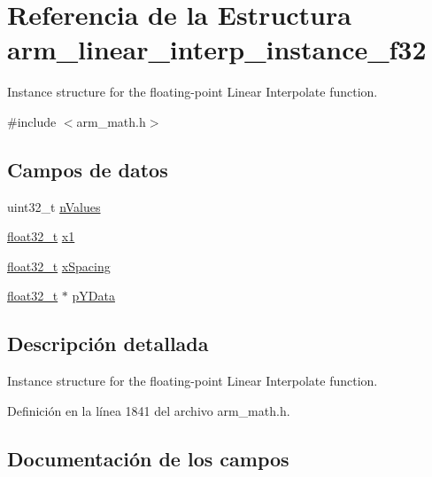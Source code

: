 \hypertarget{structarm__linear__interp__instance__f32}{}\section{Referencia de la Estructura arm\+\_\+linear\+\_\+interp\+\_\+instance\+\_\+f32}
\label{structarm__linear__interp__instance__f32}


Instance structure for the floating-\/point Linear Interpolate function.  




{\ttfamily \#include $<$arm\+\_\+math.\+h$>$}

\subsection*{Campos de datos}
\begin{DoxyCompactItemize}
\item 
uint32\+\_\+t \hyperlink{structarm__linear__interp__instance__f32_a2ea653b0599388e9a72ebab9841707ba}{n\+Values}
\item 
\hyperlink{arm__math_8h_a4611b605e45ab401f02cab15c5e38715}{float32\+\_\+t} \hyperlink{structarm__linear__interp__instance__f32_a795ed79ea4c18d52afe5eb5e868e1c5a}{x1}
\item 
\hyperlink{arm__math_8h_a4611b605e45ab401f02cab15c5e38715}{float32\+\_\+t} \hyperlink{structarm__linear__interp__instance__f32_a08675584bb57fc42bbb3739c13674346}{x\+Spacing}
\item 
\hyperlink{arm__math_8h_a4611b605e45ab401f02cab15c5e38715}{float32\+\_\+t} $\ast$ \hyperlink{structarm__linear__interp__instance__f32_af1489866b69eb5db1e0afeb24c7b01e9}{p\+Y\+Data}
\end{DoxyCompactItemize}


\subsection{Descripción detallada}
Instance structure for the floating-\/point Linear Interpolate function. 

Definición en la línea 1841 del archivo arm\+\_\+math.\+h.



\subsection{Documentación de los campos}
